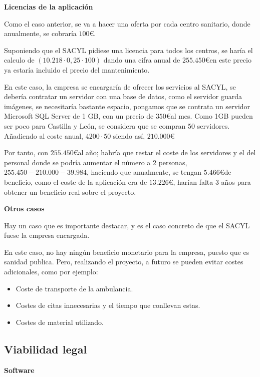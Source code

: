 \textbf{Licencias de la aplicación}

Como el caso anterior, se va a hacer una oferta por cada centro sanitario, donde anualmente, se cobraría $100 $\euro.

Suponiendo que el SACYL pidiese una licencia para todos los centros, se haría el calculo de $(10.218 · 0,25 · 100 ) $ dando una cifra anual de $255.450 $\euro en este precio ya estaría incluido el precio del mantenimiento.

En este caso, la empresa se encargaría de ofrecer los servicios al SACYL, se debería contratar un servidor con una base de datos, como el servidor guarda imágenes, se necesitaría bastante espacio, pongamos que se contrata un servidor Microsoft SQL Server de 1 GB, con un precio de $350$\euro al mes. Como 1GB pueden ser poco para Castilla y León, se considera que se compran 50 servidores. Añadiendo al coste anual, $4200 · 50 $ siendo así, $210.000 $\euro

Por tanto, con $255.450 $\euro al año; habría que restar el coste de los servidores y el del personal donde se podría aumentar el número a 2 personas,   $255.450 - 210.000 - 39.984 $, haciendo que anualmente, se tengan $5.466 $\euro de beneficio, como el coste de la aplicación era de 
 $13.226 $\euro, harían falta 3 años para obtener un beneficio real sobre el proyecto.

\textbf{Otros casos}

Hay un caso que es importante destacar, y es el caso concreto de que el SACYL fuese la empresa encargada.

En este caso, no hay ningún beneficio monetario para la empresa, puesto que es sanidad publica. Pero, realizando el proyecto, a futuro se pueden evitar costes adicionales, como por ejemplo: 
\begin{itemize}
    \item Coste de transporte de la ambulancia.
    \item Costes de citas innecesarias y el tiempo que conllevan estas.
    \item Costes de material utilizado.
\end{itemize}

\subsection{Viabilidad legal}

\textbf{Software}

